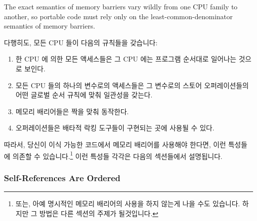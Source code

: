 The exact semantics of memory barriers vary wildly from one CPU family to
another, so portable code must rely only on the least-common-denominator
semantics of memory barriers.
\fi

다행히도, 모든 CPU 들이 다음의 규칙들을 갖습니다:
\begin{enumerate}
\item	한 CPU 에 의한 모든 액세스들은 그 CPU 에는 프로그램 순서대로 일어나는
	것으로 보인다.
\item	모든 CPU 들의 하나의 변수로의 액세스들은 그 변수로의 스토어
	오퍼레이션들의 어떤 글로벌 순서 규칙에 맞춰 일관성을 갖는다.
\item	메모리 배리어들은 짝을 맞춰 동작한다.
\item	오퍼레이션들은 배타적 락킹 도구들이 구현되는 곳에 사용될 수 있다.
\end{enumerate}

따라서, 당신이 이식 가능한 코드에서 메모리 배리어를 사용해야 한다면, 이런
특성들에 의존할 수 있습니다.\footnote{
	또는, 아예 명시적인 메모리 배리어의 사용을 하지 않는게 나을 수도
	있습니다.
	하지만 그 방법은 다른 섹션의 주제가 될것입니다.}
이런 특성들 각각은 다음의 섹션들에서 설명됩니다.

\subsubsection{Self-References Are Ordered}

